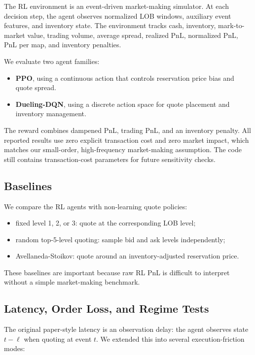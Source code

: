 \documentclass[11pt]{article}
\begin{document}
The RL environment is an event-driven market-making simulator. At each decision
step, the agent observes normalized LOB windows, auxiliary event features, and
inventory state. The environment tracks cash, inventory, mark-to-market value,
trading volume, average spread, realized PnL, normalized PnL, PnL per map, and
inventory penalties.

We evaluate two agent families:

\begin{itemize}
  \item \textbf{PPO}, using a continuous action that controls reservation price
  bias and quote spread.
  \item \textbf{Dueling-DQN}, using a discrete action space for quote placement
  and inventory management.
\end{itemize}

The reward combines dampened PnL, trading PnL, and an inventory penalty. All
reported results use zero explicit transaction cost and zero market impact, which
matches our small-order, high-frequency market-making assumption. The code still
contains transaction-cost parameters for future sensitivity checks.

\subsection{Baselines}

We compare the RL agents with non-learning quote policies:

\begin{itemize}
  \item fixed level 1, 2, or 3: quote at the corresponding LOB level;
  \item random top-5-level quoting: sample bid and ask levels independently;
  \item Avellaneda-Stoikov: quote around an inventory-adjusted reservation price.
\end{itemize}

These baselines are important because raw RL PnL is difficult to interpret
without a simple market-making benchmark.

\subsection{Latency, Order Loss, and Regime Tests}

The original paper-style latency is an observation delay: the agent observes
state $t-\ell$ when quoting at event $t$. We extended this into several
execution-friction modes:
\end{document}
